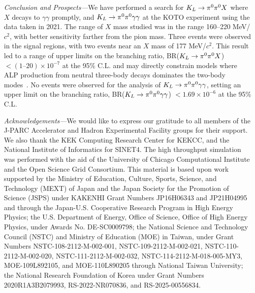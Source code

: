 \documentclass[twocolumn, superscriptaddress, aps,prl]{revtex4-2}
\newcommand{\mycomment}[1]{}
\begin{document}
\textit{Conclusion and Prospects---}We have performed a search for $K_L \rightarrow \pi^0 \pi^0 X$ where $X$ decays to $\gamma\gamma$ promptly, and $K_L \rightarrow \pi^0 \pi^0 \gamma \gamma$ at the KOTO experiment using the data taken in 2021. The range of $X$ mass studied was in the range 160--220 MeV/$c^2$, with better sensitivity farther from the pion mass. Three events were observed in the signal regions, with two events near an $X$ mass of 177 MeV/$c^2$. This result led to a range of upper limits on the branching ratio, BR($K_L \rightarrow \pi^0 \pi^0 X$) $< (1\text{--}20) \times 10^{-7}$ at the 95\% C.L. and may directly constrain models where ALP production from neutral three-body decays dominates the two-body modes~\cite{flavourviolation_alp_balkin}. No events were observed for the analysis of $K_L \rightarrow \pi^0 \pi^0 \gamma \gamma$, setting an upper limit on the branching ratio, BR($K_L \rightarrow \pi^0 \pi^0 \gamma \gamma$) $< 1.69 \times 10^{-6}$ at the 95\% C.L.
\mycomment{The statistics of six cluster data taken by KOTO in 2024--2025 is twice that shown in this analysis, allowing for a deeper search for these modes. These studies are not limited by background contamination, and proportional improvements are expected with more data. This analysis will not be limited by computing power with the aid of the Open Science Grid (OSG) since the time to obtain an adequate simulated $\ppp$ background sample is still reasonable.}



\textit{Acknowledgements---}We would like to express our gratitude to all members of the J-PARC Accelerator and Hadron Experimental Facility groups for their support. We also thank the KEK Computing Research Center for KEKCC, and the National Institute of Informatics for SINET4. The high throughput simulation was performed with the aid of the University of Chicago Computational Institute and the Open Science Grid Consortium. This material is based upon work supported by the Ministry of Education, Culture, Sports, Science, and Technology (MEXT) of Japan and the Japan Society for the Promotion of Science (JSPS) under KAKENHI Grant Numbers JP16H06343 and JP21H04995 and through the Japan-U.S. Cooperative Research Program in High Energy Physics; the U.S. Department of Energy, Office of Science, Office of High Energy Physics, under Awards No. DE-SC0009798; the National Science and Technology Council (NSTC) and Ministry of Education (MOE) in Taiwan, under Grant Numbers NSTC-108-2112-M-002-001, NSTC-109-2112-M-002-021, NSTC-110-2112-M-002-020, NSTC-111-2112-M-002-032, NSTC-114-2112-M-018-005-MY3, MOE-109L892105, and MOE-110L890205 through National Taiwan University; the National Research Foundation of Korea under Grant Numbers 2020R1A3B2079993, RS-2022-NR070836, and RS-2025-00556834.

\appendix









\end{document}
